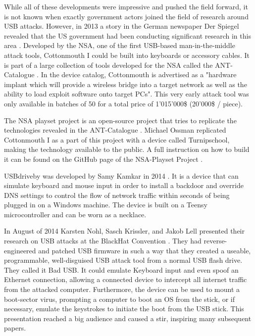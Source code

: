 While all of these developments were impressive and pushed the field forward, it is not known when exactly government actors joined the field of research around USB attacks. However, in 2013 a story in the German newspaper Der Spiegel revealed that the US government had been conducting significant research in this area \cite{appelbaumCatalogRevealsNSA2013}. Developed by the NSA, one of the first USB-based man-in-the-middle attack tools, Cottonmouth I could be built into keyboards or accessory cables. It is part of a large collection of tools developed for the NSA called the ANT-Catalogue \cite{InteractiveGraphicNSA}. In the device catalog, Cottonmouth is advertised as a "hardware implant which will provide a wireless bridge into a target network as well as the ability to load exploit software onto target PCs". This very early attack tool was only available in batches of 50 for a total price of 1'015'000\$ (20'000\$ / piece).

The NSA playset project is an open-source project that tries to replicate the technologies revealed in the ANT-Catalogue \cite{NSAPlaysetTurnipschoolHtml}. Michael Ossman replicated Cottonmouth I as a part of this project with a device called Turnipschool, making the technology available to the public. A full instruction on how to build it can be found on the GitHub page of the NSA-Playset Project \cite{NSAPlaysetTurnipschoolHtml}.

USBdriveby was developed by Samy Kamkar in 2014 \cite{SamyKamkarUSBdriveby}. It is a device that can simulate keyboard and mouse input in order to install a backdoor and override DNS settings to control the flow of network traffic within seconds of being plugged in on a Windows machine. The device is built on a Teensy microcontroller and can be worn as a necklace.

In August of 2014 Karsten Nohl, Sasch Krissler, and Jakob Lell presented their research on USB attacks at the BlackHat Convention \cite{Srlabsbadusbblackhatv1Pdf2014}. They had reverse-engineered and patched USB firmware in such a way that they created a useable, programmable, well-disguised USB attack tool from a normal USB flash drive. They called it Bad USB. It could emulate Keyboard input and even spoof an Ethernet connection, allowing a connected device to intercept all internet traffic from the attacked computer. Furthermore, the device can be used to mount a boot-sector virus, prompting a computer to boot an OS from the stick, or if necessary, emulate the keystrokes to initiate the boot from the USB stick. This presentation reached a big audience and caused a stir, inspiring many subsequent papers.

